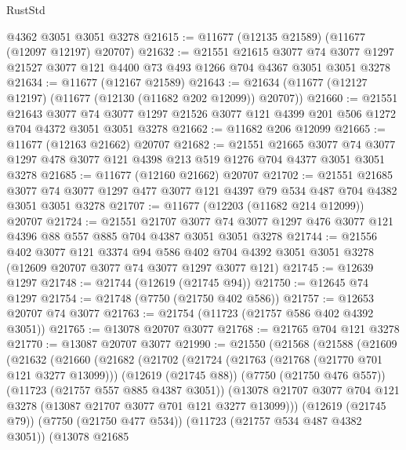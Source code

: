 \begin{lexlean}{RustStd}
\begin{coremodule}
    @4362
    @3051
    @3051
    @3278
@21615 := @11677 (@12135 @21589) (@11677 (@12097 @12197) @20707)
@21632 := @21551
    @21615
    @3077
    @74
    @3077
    @1297
    @21527
    @3077
    @121
    @4400
    @73
    @493
    @1266
    @704
    @4367
    @3051
    @3051
    @3278
@21634 := @11677 (@12167 @21589)
@21643 := @21634 (@11677 (@12127 @12197) (@11677 (@12130 (@11682 @202 @12099)) @20707))
@21660 := @21551
    @21643
    @3077
    @74
    @3077
    @1297
    @21526
    @3077
    @121
    @4399
    @201
    @506
    @1272
    @704
    @4372
    @3051
    @3051
    @3278
@21662 := @11682 @206 @12099
@21665 := @11677 (@12163 @21662) @20707
@21682 := @21551
    @21665
    @3077
    @74
    @3077
    @1297
    @478
    @3077
    @121
    @4398
    @213
    @519
    @1276
    @704
    @4377
    @3051
    @3051
    @3278
@21685 := @11677 (@12160 @21662) @20707
@21702 := @21551
    @21685
    @3077
    @74
    @3077
    @1297
    @477
    @3077
    @121
    @4397
    @79
    @534
    @487
    @704
    @4382
    @3051
    @3051
    @3278
@21707 := @11677 (@12203 (@11682 @214 @12099)) @20707
@21724 := @21551
    @21707
    @3077
    @74
    @3077
    @1297
    @476
    @3077
    @121
    @4396
    @88
    @557
    @885
    @704
    @4387
    @3051
    @3051
    @3278
@21744 := @21556
    @402
    @3077
    @121
    @3374
    @94
    @586
    @402
    @704
    @4392
    @3051
    @3051
    @3278
    (@12609 @20707 @3077 @74 @3077 @1297 @3077 @121)
@21745 := @12639 @1297
@21748 := @21744 (@12619 (@21745 @94))
@21750 := @12645 @74 @1297
@21754 := @21748 (@7750 (@21750 @402 @586))
@21757 := @12653 @20707 @74 @3077
@21763 := @21754 (@11723 (@21757 @586 @402 @4392 @3051))
@21765 := @13078 @20707 @3077
@21768 := @21765 @704 @121 @3278
@21770 := @13087 @20707 @3077
@21990 := @21550
    (@21568
      (@21588
        (@21609
          (@21632
            (@21660
              (@21682
                (@21702
                  (@21724
                    (@21763 (@21768 (@21770 @701 @121 @3277 @13099)))
                    (@12619 (@21745 @88))
                    (@7750 (@21750 @476 @557))
                    (@11723 (@21757 @557 @885 @4387 @3051))
                    (@13078
                      @21707
                      @3077
                      @704
                      @121
                      @3278
                      (@13087 @21707 @3077 @701 @121 @3277 @13099)))
                  (@12619 (@21745 @79))
                  (@7750 (@21750 @477 @534))
                  (@11723 (@21757 @534 @487 @4382 @3051))
                  (@13078
                    @21685

\end{coremodule}
\end{lexlean}
